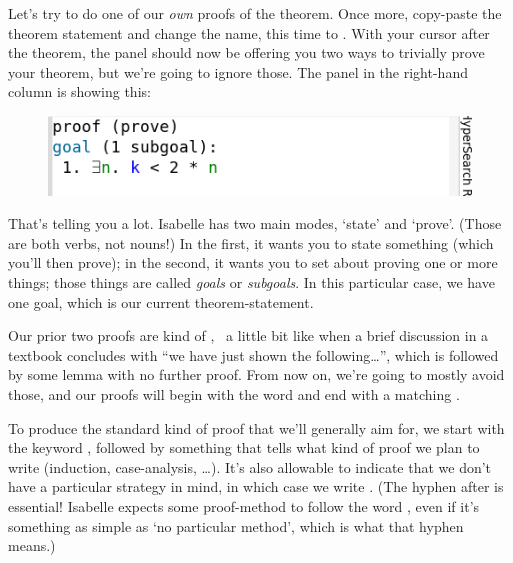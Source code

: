 
Let's try to do one of our \textit{own} proofs of the theorem. Once more, copy-paste the theorem statement and change the name, this time to . With your cursor after the theorem, the  panel should now be offering you two ways to trivially prove your theorem, but we're going to ignore those. The  panel in the right-hand column is showing this:
\begin{figure}[h]
    \includegraphics[width=0.75\linewidth]{TEXT/C01/Images/state-panel.png}
\end{figure}

That's telling you a lot. Isabelle has two main modes, `state' and `prove'. (Those are both verbs, not nouns!) In the first, it wants you to state something (which you'll then prove); in the second, it wants you to set about proving one or more things; those things are called \textit{goals} or \textit{subgoals}. In this particular case, we have one goal, which is our current theorem-statement. 

Our prior two proofs are kind of ,  a little bit like when a brief discussion in a textbook concludes with ``we have just shown the following…'', which is followed by some lemma with no further proof. From now on, we're going to mostly avoid those, and our proofs will begin with the word  and end with a matching . 

To produce the standard kind of proof that we'll generally aim for, we start with the keyword , followed by something that tells what kind of proof we plan to write (induction, case-analysis, \ldots ). It's also allowable to indicate that we don't have a particular strategy in mind, in which case we write . (The hyphen after  is essential! Isabelle expects some proof-method to follow the word , even if it's something as simple as `no particular method', which is what that hyphen means.)

